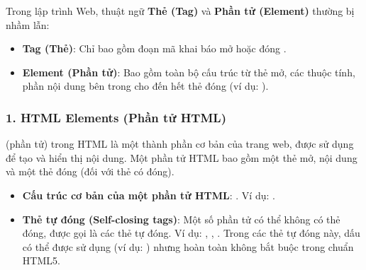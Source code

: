 \begin{conceptBox}
Trong lập trình Web, thuật ngữ \textbf{Thẻ (Tag)} và \textbf{Phần tử (Element)} thường bị nhầm lẫn:
\begin{itemize}[leftmargin=1.5em, itemsep=2pt, parsep=0pt]
    \item \textbf{Tag (Thẻ)}: Chỉ bao gồm đoạn mã khai báo mở  hoặc đóng .
    \item \textbf{Element (Phần tử)}: Bao gồm toàn bộ cấu trúc từ thẻ mở, các thuộc tính, phần nội dung bên trong cho đến hết thẻ đóng (ví dụ: ).
\end{itemize}
\end{conceptBox}

\subsubsection{1. HTML Elements (Phần tử HTML)}
 (phần tử) trong HTML là một thành phần cơ bản của trang web, được sử dụng để tạo và hiển thị nội dung. Một phần tử HTML bao gồm một thẻ mở, nội dung và một thẻ đóng (đối với thẻ có đóng).

\begin{itemize}[leftmargin=1.8em, itemsep=3pt, parsep=0pt]
    \item \textbf{Cấu trúc cơ bản của một phần tử HTML}: . Ví dụ: .
    \item \textbf{Thẻ tự đóng (Self-closing tags)}: Một số phần tử có thể không có thẻ đóng, được gọi là các thẻ tự đóng. Ví dụ: , , . Trong các thẻ tự đóng này, dấu \codeinline{/>} có thể được sử dụng (ví dụ: ) nhưng hoàn toàn không bắt buộc trong chuẩn HTML5.
\end{itemize}

